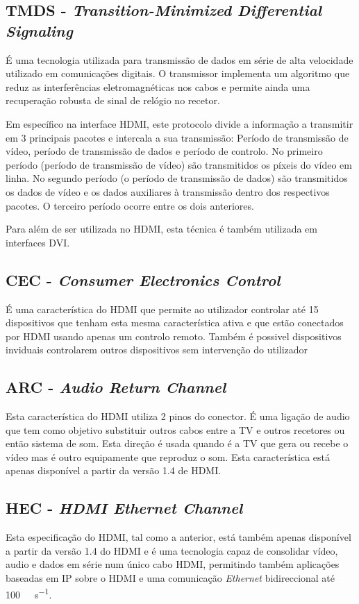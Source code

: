 \subsection*{TMDS - \textit{Transition-Minimized Differential Signaling} } \label{subsec:TMDS} 
É uma tecnologia utilizada para transmissão de dados em série de alta velocidade utilizado em comunicações digitais. O transmissor implementa um algoritmo que reduz as interferências eletromagnéticas nos cabos e permite ainda uma recuperação robusta de sinal de relógio no recetor. 

Em específico na interface HDMI, este protocolo divide a informação a transmitir em 3 principais pacotes e intercala a sua transmissão: Período de transmissão de vídeo, período de transmissão de dados e período de controlo. No primeiro período (período de transmissão de vídeo) são transmitidos os píxeis do vídeo em linha. No segundo período (o período de transmissão de dados) são transmitidos os dados de vídeo e os dados auxiliares à transmissão dentro dos respectivos pacotes. O terceiro período ocorre entre os dois anteriores. 

Para além de ser utilizada no HDMI, esta técnica é também utilizada em interfaces DVI.

\subsection*{CEC - \textit{Consumer Electronics Control} } \label{subsec:CEC} 
É uma característica do HDMI que permite ao utilizador controlar até 15 dispositivos que tenham esta mesma característica ativa e que estão conectados por HDMI usando apenas um controlo remoto. Também é possivel dispositivos inviduais controlarem outros dispositivos sem intervenção do utilizador

\subsection*{ARC - \textit{Audio Return Channel}  } \label{subsec:ARC} 
Esta característica do HDMI utiliza 2 pinos do conector. É uma ligação de audio que tem como objetivo substituir outros cabos entre a TV e outros recetores ou então sistema de som. Esta direção é usada quando é a TV que gera ou recebe o vídeo mas é outro equipamente que reproduz o som. Esta característica está apenas disponível a partir da versão 1.4 de HDMI.

\subsection*{HEC - \textit{HDMI Ethernet Channel}  } \label{subsec:HEC} 
Esta especificação do HDMI, tal como a anterior, está também apenas disponível a partir da versão 1.4 do HDMI e é uma tecnologia capaz de consolidar vídeo, audio e dados em série num único cabo HDMI, permitindo também aplicações baseadas em IP sobre o HDMI e uma comunicação \textit{Ethernet} bidireccional até \SI{100}{\mega\bit\per\second}.

